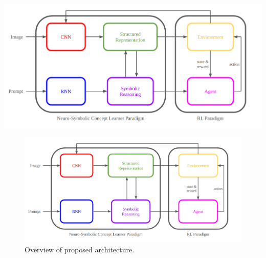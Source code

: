 \documentclass[doublespace,draft,nopageskip]{VTthesis} %
\begin{document}
		\includegraphics[max width=\textwidth-325pt, center]{architecture_overview}
    \begin{figure}[htb]
        \centering
		    \includegraphics[scale=0.25]{./images/architecture_overview}
				\caption{Overview of proposed architecture.} 
			\label{fig:architecture_overview}
	\end{figure}
\end{document}
